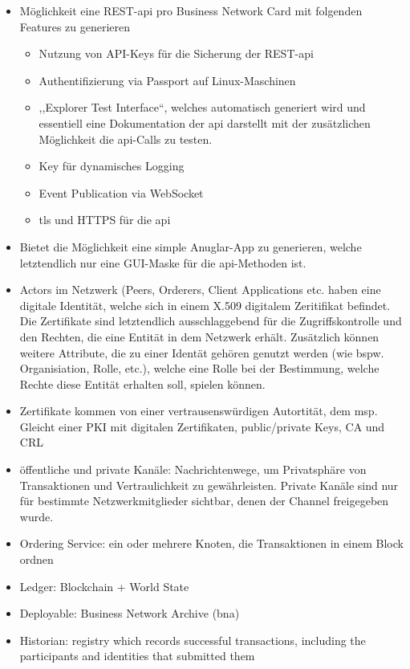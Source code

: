         \begin{itemize}[noitemsep]
            \item Möglichkeit eine REST-\gls{api} pro Business Network Card mit folgenden Features zu generieren
                \begin{itemize}[noitemsep]
                    \item Nutzung von API-Keys für die Sicherung der REST-\gls{api}
                    \item Authentifizierung via Passport auf Linux-Maschinen
                    \item ,,Explorer Test Interface``, welches automatisch generiert wird und essentiell eine Dokumentation der \gls{api} darstellt mit der zusätzlichen Möglichkeit die \gls{api}-Calls zu testen.
                    \item Key für dynamisches Logging
                    \item Event Publication via WebSocket
                    \item \gls{tls} und HTTPS für die \gls{api}
                \end{itemize}
            \item Bietet die Möglichkeit eine simple Anuglar-App zu generieren, welche letztendlich nur eine GUI-Maske für die \gls{api}-Methoden ist.
            \item Actors im Netzwerk (Peers, Orderers, Client Applications etc. haben eine digitale Identität, welche sich in einem X.509 digitalem Zeritifikat befindet.
                Die Zertifikate sind letztendlich ausschlaggebend für die Zugriffskontrolle und den Rechten, die eine Entität in dem Netzwerk erhält. 
                Zusätzlich können weitere Attribute, die zu einer Identät gehören genutzt werden (wie bspw. Organisiation, Rolle, etc.), welche eine Rolle bei der Bestimmung, welche Rechte diese Entität erhalten soll, spielen können.
            \item Zertifikate kommen von einer vertrausenswürdigen Autortität, dem \gls{msp}. 
                Gleicht einer PKI mit digitalen Zertifikaten, public/\-private Keys, CA und CRL
            \item öffentliche und private Kanäle: Nachrichtenwege, um Privatsphäre von Transaktionen und Vertraulichkeit zu gewährleisten.
                Private Kanäle sind nur für bestimmte Netzwerkmitglieder sichtbar, denen der Channel freigegeben wurde.
            \item Ordering Service: ein oder mehrere Knoten, die Transaktionen in einem Block ordnen
            \item Ledger: Blockchain + World State
            \item Deployable: Business Network Archive (bna)
            \item Historian: registry which records successful transactions, including the participants and identities that submitted them
        \end{itemize}
        
